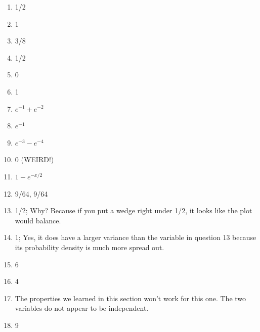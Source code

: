 \documentclass[
]{book}
\providecommand{\tightlist}{%
  \setlength{\itemsep}{0pt}\setlength{\parskip}{0pt}}
\theoremstyle{definition}
\theoremstyle{definition}
\theoremstyle{definition}
\theoremstyle{definition}
\theoremstyle{remark}
\begin{document}
\begin{enumerate}
\def\labelenumi{\arabic{enumi}.}
\tightlist
\item
  1/2
\item
  1
\item
  3/8
\item
  1/2
\item
  0
\item
  1
\item
  \(e^{-1} + e^{-2}\)
\item
  \(e^{-1}\)
\item
  \(e^{-3}-e^{-4}\)
\item
  0 (WEIRD!)
\item
  \(1 - e^{-x/2}\)
\item
  9/64, 9/64
\item
  1/2; Why? Because if you put a wedge right under 1/2, it looks like the plot would balance.
\item
  1; Yes, it does have a larger variance than the variable in question 13 because its probability density is much more spread out.
\item
  6
\item
  4
\item
  The properties we learned in this section won't work for this one. The two variables do not appear to be independent.
\item
  9
\end{enumerate}


\end{document}
